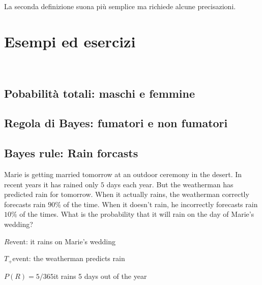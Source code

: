 \documentclass[10pt,openany]{book}
\def\emph#1{\textcolor{blue}{\textbf{\boldmath #1}}}
\theoremstyle{mio}
\theoremstyle{liscio}
\begin{document}
La seconda definizione suona più semplice ma richiede alcune precisazioni. 


% 
% 
% 
% 
% 


\chapter{Esempi ed esercizi}
\label{ch2}

\ \ 



\clearpage\section{Pobabilità totali: maschi e femmine}
\label{MF_totali}




\clearpage\section{Regola di Bayes: fumatori e non fumatori}
\label{Fumatori_Bayes}



\clearpage\section{Bayes rule: Rain forcasts}
\label{rain_desert}

Marie is getting married tomorrow at an outdoor ceremony in the desert. In recent years it has rained only $5$ days each year. But the weatherman has predicted rain for tomorrow. When it actually rains, the weatherman correctly forecasts rain $90\%$ of the time. When it doesn’t rain, he incorrectly forecasts rain $10\%$ of the times. What is the probability that it will rain on the day of Marie’s wedding?


$R$\hfill event: it rains on Marie’s wedding

$T_+$\hfill event: the weatherman predicts rain

$P (R) = 5/365$\hfill it rains 5 days out of the year
\end{document}

